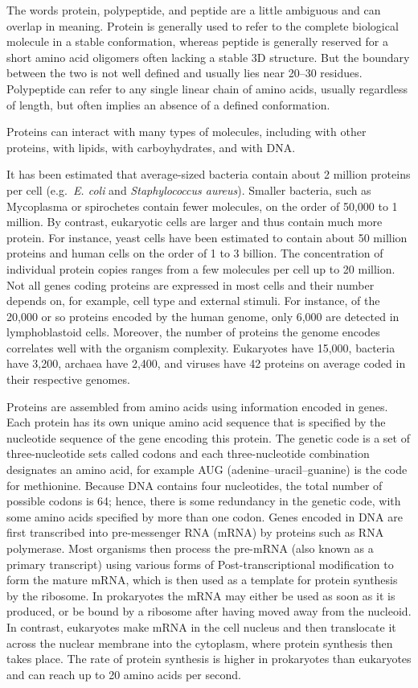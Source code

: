 The words protein, polypeptide, and peptide are a little ambiguous and
can overlap in meaning. Protein is generally used to refer to the
complete biological molecule in a stable conformation, whereas peptide
is generally reserved for a short amino acid oligomers often lacking a
stable 3D structure. But the boundary between the two is not well
defined and usually lies near 20--30 residues. Polypeptide can refer to
any single linear chain of amino acids, usually regardless of length,
but often implies an absence of a defined conformation.

Proteins can interact with many types of molecules, including with other
proteins, with lipids, with carboyhydrates, and with DNA.

It has been estimated that average-sized bacteria contain about 2
million proteins per cell (e.g.~\emph{E. coli} and \emph{Staphylococcus
aureus}). Smaller bacteria, such as Mycoplasma or spirochetes contain
fewer molecules, on the order of 50,000 to 1 million. By contrast,
eukaryotic cells are larger and thus contain much more protein. For
instance, yeast cells have been estimated to contain about 50 million
proteins and human cells on the order of 1 to 3 billion. The
concentration of individual protein copies ranges from a few molecules
per cell up to 20 million. Not all genes coding proteins are expressed
in most cells and their number depends on, for example, cell type and
external stimuli. For instance, of the 20,000 or so proteins encoded by
the human genome, only 6,000 are detected in lymphoblastoid cells.
Moreover, the number of proteins the genome encodes correlates well with
the organism complexity. Eukaryotes have 15,000, bacteria have 3,200,
archaea have 2,400, and viruses have 42 proteins on average coded in
their respective genomes.

Proteins are assembled from amino acids using information encoded in
genes. Each protein has its own unique amino acid sequence that is
specified by the nucleotide sequence of the gene encoding this protein.
The genetic code is a set of three-nucleotide sets called codons and
each three-nucleotide combination designates an amino acid, for example
AUG (adenine--uracil--guanine) is the code for methionine. Because DNA
contains four nucleotides, the total number of possible codons is 64;
hence, there is some redundancy in the genetic code, with some amino
acids specified by more than one codon. Genes encoded in DNA are first
transcribed into pre-messenger RNA (mRNA) by proteins such as RNA
polymerase. Most organisms then process the pre-mRNA (also known as a
primary transcript) using various forms of Post-transcriptional
modification to form the mature mRNA, which is then used as a template
for protein synthesis by the ribosome. In prokaryotes the mRNA may
either be used as soon as it is produced, or be bound by a ribosome
after having moved away from the nucleoid. In contrast, eukaryotes make
mRNA in the cell nucleus and then translocate it across the nuclear
membrane into the cytoplasm, where protein synthesis then takes place.
The rate of protein synthesis is higher in prokaryotes than eukaryotes
and can reach up to 20 amino acids per second.

